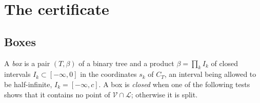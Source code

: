 \documentclass[11pt,a4paper]{article}
\theoremstyle{definition}
\theoremstyle{remark}
\newcommand{\V}{\mathcal{V}}
\newcommand{\Lam}{\mathcal{L}}
\begin{document}
\section{The certificate}\label{sec:certificate}

\subsection{Boxes}
A \emph{box} is a pair $(T, \beta)$ of a binary tree and a product $\beta = \prod_k I_k$ of closed
intervals $I_k \subset [-\infty, 0]$ in the coordinates $s_k$ of $C_T$, an interval being allowed to be
half-infinite, $I_k = [-\infty, c]$. A box is \emph{closed} when one of the following tests shows that it
contains no point of $\V \cap \Lam$; otherwise it is split.
\end{document}
